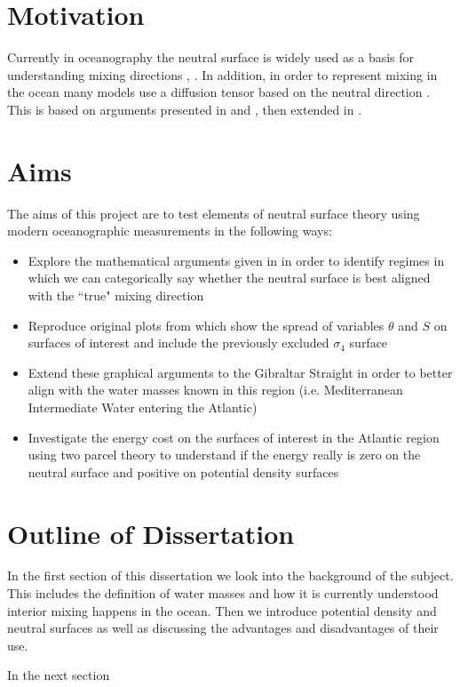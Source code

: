 \label{chapter:Introduction}

\section{Motivation}

Currently in oceanography the neutral surface is widely used as a basis for understanding mixing directions \citep{Tailleux2016}, \citep{McDougall1987}. In addition, in order to represent mixing in the ocean many models use a diffusion tensor based on the neutral direction \citep{McDougall2014}. This is based on arguments presented in \citet{McDougall1987} and \cite{JackettandMcDougall1997}, then extended in \citet{McDougall2014}. 



\section{Aims}
\label{section:intro_aims}

The aims of this project are to test elements of neutral surface theory using modern oceanographic measurements in the following ways:

\begin{itemize}
    \item Explore the mathematical arguments given in \citet{McDougall1987} in order to identify regimes in which we can categorically say whether the neutral surface is best aligned with the ``true" mixing direction  
    
    \item Reproduce original plots from \citet{McDougall1987} which show the spread of variables $\theta$ and $S$ on surfaces of interest and include the previously excluded $\sigma_4$ surface
    
    \item Extend these graphical arguments to the Gibraltar Straight in order to better align with the water masses known in this region (i.e. Mediterranean Intermediate Water entering the Atlantic)
    
    \item Investigate the energy cost on the surfaces of interest in the Atlantic region using two parcel theory to understand if the energy really is zero on the neutral surface and positive on potential density surfaces
\end{itemize}

\section{Outline of Dissertation}

In the first section of this dissertation we look into the background of the subject. This includes the definition of water masses and how it is currently understood interior mixing happens in the ocean. Then we introduce potential density and neutral surfaces as well as discussing the advantages and disadvantages of their use. 

In the next section 